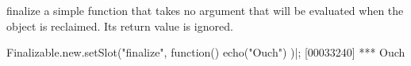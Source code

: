 \begin{urbiscriptapi}
\item[finalize] a simple function that takes no argument that will be
  evaluated when the object is reclaimed.  Its return value is
  ignored.
\begin{urbiscript}
Finalizable.new.setSlot("finalize", function() { echo("Ouch") })|;
[00033240] *** Ouch
\end{urbiscript}
\end{urbiscriptapi}

